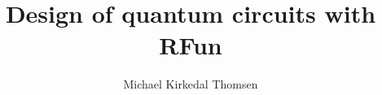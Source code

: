 \documentclass[final]{beamer}
\title{Design of quantum circuits with RFun} %
\author{Michael Kirkedal Thomsen} %
\institute{m.kirkedal@di.ku.dk} %
\begin{document}
\newcommand{\rfun}{RFun\xspace}




\renewcommand{\o}{\texttt{;}}
\renewcommand{\a}{\alpha}
\renewcommand{\i}[1]{#1^{\mbox{-}1}}
\newcommand{\rupd}{\rightarrow}
\newcommand{\cgen}{\;\texttt{?}\;}
\newcommand{\cspe}{\;\texttt{?}\;}
\newcommand{\crev}{\;\texttt{!}\;}
\newcommand{\fdown}[1]{\diagdown}
\newcommand{\fup}[1]{\diagup}
\newcommand{\id}{\ensuremath{\mathsf{Id}}}
\newcommand{\cnot}{\ensuremath{\mathsf{Cnot}}}
\newcommand{\hgate}{\ensuremath{\mathsf{H}}}
\newcommand{\tgate}{\ensuremath{\mathsf{T}}}
\newcommand{\notg}{\ensuremath{\mathsf{Not}}}
\newcommand{\zip}{\ensuremath{\mathsf{Zip}}}
\newcommand{\concat}{\ensuremath{\mathsf{Concat}}}
\newcommand{\spli}{\ensuremath{\mathsf{Split}}}
\newcommand{\flip}{\ensuremath{\mathsf{Flip}}}
\newcommand{\rup}{\ensuremath{\mathsf{Rup}}}
\newcommand{\rdown}{\ensuremath{\mathsf{Rdn}}}
\newcommand{\lif}{\;\mathrm{if}\;}
\newcommand{\lelse}{\;\mathrm{else}\;}








\setlength{\belowcaptionskip}{2ex} %
\setlength\belowdisplayshortskip{2ex} %
\end{document}
